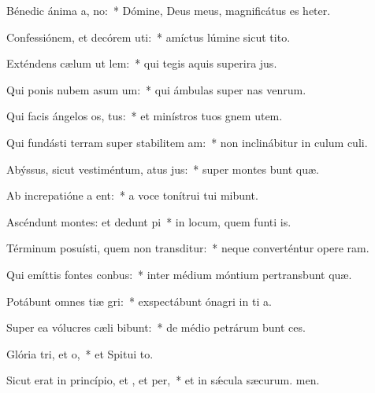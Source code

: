 \item Bénedic ánima a, no:~* Dómine, Deus meus, magnificátus es heter.
\item Confessiónem, et decórem uti:~* amíctus lúmine sicut tito.
\item Exténdens cælum ut lem:~* qui tegis aquis superira jus.
\item Qui ponis nubem asum um:~* qui ámbulas super nas venrum.
\item Qui facis ángelos os, tus:~* et minístros tuos gnem utem.
\item Qui fundásti terram super stabilitem am:~* non inclinábitur in culum culi.
\item Abýssus, sicut vestiméntum, atus jus:~* super montes bunt quæ.
\item Ab increpatióne a ent:~* a voce tonítrui tui mibunt.
\item Ascéndunt montes: et dedunt pi~* in locum, quem funti is.
\item Términum posuísti, quem non transditur:~* neque converténtur opere ram.
\item Qui emíttis fontes  conbus:~* inter médium móntium pertransbunt quæ.
\item Potábunt omnes tiæ gri:~* exspectábunt ónagri in ti a.
\item Super ea vólucres cæli bibunt:~* de médio petrárum bunt ces.
\item Glória tri, et o,~* et Spitui to.
\item Sicut erat in princípio, et , et per,~* et in sǽcula sæcurum. men.
